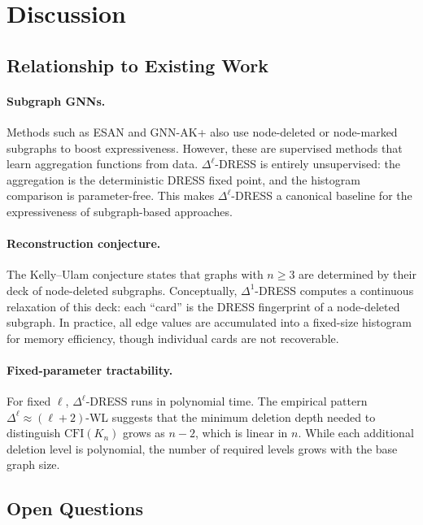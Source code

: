 \documentclass[11pt,a4paper]{article}
\begin{document}
\section{Discussion}

\subsection{Relationship to Existing Work}

\paragraph{Subgraph GNNs.} Methods such as ESAN \cite{bevilacqua2022equivariant} and GNN-AK+ \cite{zhao2022from} also use node-deleted or node-marked subgraphs to boost expressiveness. However, these are supervised methods that learn aggregation functions from data. $\Delta^\ell$-DRESS is entirely unsupervised: the aggregation is the deterministic DRESS fixed point, and the histogram comparison is parameter-free. This makes $\Delta^\ell$-DRESS a canonical baseline for the expressiveness of subgraph-based approaches.

\paragraph{Reconstruction conjecture.} The Kelly--Ulam conjecture \cite{kelly1942congruence, ulam1960collection} states that graphs with $n \ge 3$ are determined by their deck of node-deleted subgraphs. Conceptually, $\Delta^1$-DRESS computes a continuous relaxation of this deck: each ``card'' is the DRESS fingerprint of a node-deleted subgraph. In practice, all edge values are accumulated into a fixed-size histogram for memory efficiency, though individual cards are not recoverable.

\paragraph{Fixed-parameter tractability.} For fixed $\ell$, $\Delta^\ell$-DRESS runs in polynomial time. The empirical pattern $\Delta^\ell \approx (\ell+2)$-WL suggests that the minimum deletion depth needed to distinguish $\text{CFI}(K_n)$ grows as $n - 2$, which is linear in $n$. While each additional deletion level is polynomial, the number of required levels grows with the base graph size.

\subsection{Open Questions}
\end{document}
